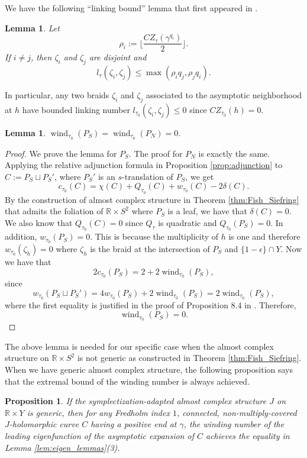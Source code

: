 \documentclass{article}
\numberwithin{equation}{section}
\newtheorem{proposition}[theorem]{Proposition}
\newtheorem{lemma}[theorem]{Lemma}
\theoremstyle{definition}
\newcommand{\R}{\mathbb{R}}
\newcommand{\wind}{\operatorname{wind}}
\begin{document}
We have the following ``linking bound'' lemma that first appeared in \cite{Hutchings_index_inequality}.
\begin{lemma}\cite[Lemma 5.5(b)]{Hutchings}
\label{lem:linking_bound}
    Let $$\rho_i:=\Big\lfloor\frac{CZ_\tau(\gamma^{q_i})}{2}\Big\rfloor.$$ 
    If $i\neq j$, then $\zeta_i$ and $\zeta_j$ are disjoint and $$l_\tau(\zeta_i, \zeta_j) \leq \max(\rho_i q_j, \rho_j q_i).$$
\end{lemma}

In particular, any two braids $\zeta_i$ and $\zeta_j$ associated to the asymptotic neighborhood at $h$ have bounded linking number $l_{\tau_0}(\zeta_i, \zeta_j) \leq 0$ since $CZ_{\tau_0}(h) = 0$.


\begin{lemma}
\label{lem:winding_zero}
$\wind_{\tau_0} (P_S) = \wind_{\tau_0} (P_N) = 0$.
\end{lemma}
\begin{proof}
We prove the lemma for $P_S$. The proof for $P_N$ is exactly the same. Applying the relative adjunction formula in Proposition \ref{prop:adjunction} to $C:= P_S \sqcup P_S'$, where $P_S'$ is an $s$-translation of $P_S$, we get
$$c_{\tau_0}(C) = \chi(C)+Q_{\tau_0}(C)+w_{\tau_0}(C)-2\delta(C).$$
By the construction of almost complex structure in Theorem \ref{thm:Fish_Siefring} that admits the foliation of $\R \times S^2$ where $P_S$ is a leaf, we have that $\delta(C) = 0$. We also know that $Q_{\tau_0}(C) = 0$ since $Q_\tau$ is quadratic and $Q_{\tau_0}(P_S) = 0$. In addition, $w_{\tau_0}(P_S) = 0$. This is because the multiplicity of $h$ is one and therefore $w_{\tau_0}(\zeta_h) = 0$ where $\zeta_h$ is the braid at the intersection of $P_S$ and $\{1-\epsilon\}\cap Y$. Now we have that $$2c_{\tau_0}(P_S) = 2 + 2\wind_{\tau_0}(P_S),$$
since 
$$w_{\tau_0}(P_S \sqcup P_S') = 4 w_{\tau_0}(P_S)+ 2\wind_{\tau_0}(P_S) = 2 \wind_{\tau_0}(P_S),$$ 
where the first equality is justified in the proof of Proposition 8.4 in \cite{Hutchings_index_inequality}. Therefore,
$$\wind_{\tau_0}(P_S) = 0.$$
\end{proof}


The above lemma is needed for our specific case when the almost complex structure on $\R \times S^2$ is not generic as constructed in Theorem \ref{thm:Fish_Siefring}. When we have generic almost complex structure, the following proposition says that the extremal bound of the winding number is always achieved.

\begin{proposition}\cite[Proposition 3.2]{HT_gluing2} 
\label{prop:maxwinding}
If the symplectization-adapted almost complex structure $J$ on $\R \times Y$ is generic, then for any Fredholm index $1$, connected, non-multiply-covered $J$-holomorphic curve $C$ having a positive end at $\gamma$, the winding number of the leading eigenfunction of the asymptotic expansion of $C$ achieves the equality in Lemma \ref{lem:eigen_lemmas}(3).
\end{proposition}
\end{document}
